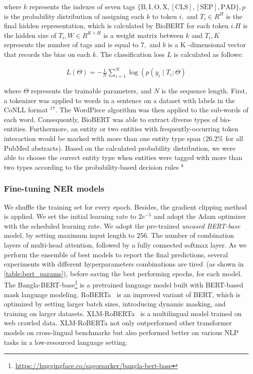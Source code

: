 \hspace*{3.5mm} where $k$ represents the indexes of seven tags $\{\mathrm{B}, \mathrm{I}, \mathrm{O}, \mathrm{X},[\mathrm{CLS}],[\mathrm{SEP}], \mathrm{PAD}\}, p$ is the probability distribution of assigning each $k$ to token $i,$ and $T_{i} \in R^{H}$ is the final hidden representation, which is calculated by BioBERT for each token $i . H$ is the hidden size of $T_{i}, W \in R^{K \times H}$ is a weight matrix between $k$ and $T_{i}, K$ represents the number of tags and is equal to $7,$ and $b$ is a $\mathrm{K}$ -dimensional vector that records the bias on each $k .$ The classification loss $L$ is calculated as follows:

\begin{align}
    L(\Theta)=-\frac{1}{N} \sum_{i=1}^{N} \log \left(p\left(y_{i} \mid T_{i} ; \Theta\right)\right.
\end{align}

\hspace*{3.5mm} where $\Theta$ represents the trainable parameters, and $N$ is the sequence length. First, a tokenizer was applied to words in a sentence on a dataset with labels in the CoNLL format $^{17}$. The WordPiece algorithm was then applied to the sub-words of each word. Consequently, BioBERT was able to extract diverse types of bio-entities. Furthermore, an entity or two entities with frequently-occurring token interaction would be marked with more than one entity type span $(26.2 \%$ for all PubMed abstracts). Based on the calculated probability distribution, we were able to choose the correct entity type when entities were tagged with more than two types according to the probability-based decision rules $^{8}$

\subsubsection{Fine-tuning NER models}
We shuffle the training set for every epoch. Besides, the gradient clipping method is applied. We set the initial learning rate to $2 e^{-5}$ and adopt the Adam optimizer with the scheduled learning rate. We adopt the pre-trained \textit{uncased BERT-base} model, by setting maximum input length to $256$. The number of combination layers of multi-head attention, followed by a fully connected softmax layer.
As we perform the ensemble of best models to report the final predictions, several experiments with different hyperparameters combinations are tired~(as shown in \cref{table:bert_params}), before saving the best performing epochs, for each model. The Bangla-BERT-base\footnote{\url{https://huggingface.co/sagorsarker/bangla-bert-base}} is a pretrained language model built with BERT-based mask language modeling. RoBERTa~\cite{liu2019roberta} is an improved variant of BERT, which is optimized by setting larger batch sizes, introducing dynamic masking, and training on larger datasets. XLM-RoBERTa~\cite{conneau2019unsupervised} is a multilingual model trained on web crawled data. XLM-RoBERTa not only outperformed other transformer models on cross-lingual benchmarks but also performed better on various NLP tasks in a low-resourced language setting.

